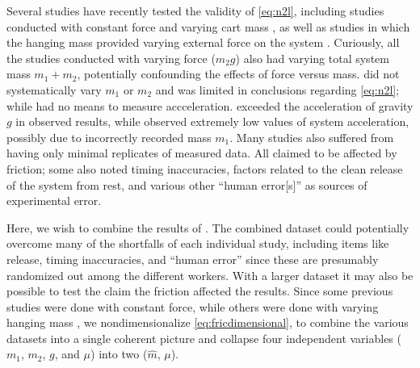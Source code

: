 \documentclass[reprint,amsmath,amssymb,aps,twoside]{revtex4-2}
\begin{document}
Several studies have recently tested the validity of \cref{eq:n2l}, including studies conducted with constant force and varying cart mass  \cite{arenas-2024-testing,avalur-2024-verifying,canada-2024-experimental,kishore-2024-relationship,yagnyeshwaran-2024-verifying}, as well as studies in which the hanging mass provided varying external force on the system \cite{govardhanen-2024-newtons,kedharnath-2024-examining,krasnopolsky-2024-testing}. Curiously, all the studies \cite{govardhanen-2024-newtons,kedharnath-2024-examining,krasnopolsky-2024-testing} conducted with varying force ($m_2g$) also had varying total system mass $m_1+m_2$, potentially confounding the effects of force versus mass. \cite{perle-2024-experimental} did not systematically vary $m_1$ or $m_2$ and was limited in conclusions regarding \cref{eq:n2l}; while \cite{barone-2024-investigating} had no means to measure accceleration. \cite{krasnopolsky-2024-testing} exceeded the acceleration of gravity $g$ in observed results, while \cite{govardhanen-2024-newtons} observed extremely low values of system acceleration, possibly due to incorrectly recorded mass $m_1$. Many studies also suffered from having only minimal replicates of measured data. All \cite{arenas-2024-testing,avalur-2024-verifying,canada-2024-experimental,kishore-2024-relationship,yagnyeshwaran-2024-verifying,govardhanen-2024-newtons,kedharnath-2024-examining,krasnopolsky-2024-testing,perle-2024-experimental} claimed to be affected by friction; some also noted timing inaccuracies, factors related to the clean release of the system from rest, and various other ``human error[s]'' as sources of experimental error. 

Here, we wish to combine the results of \cite{arenas-2024-testing,avalur-2024-verifying,canada-2024-experimental,kishore-2024-relationship,yagnyeshwaran-2024-verifying,govardhanen-2024-newtons,kedharnath-2024-examining,krasnopolsky-2024-testing,perle-2024-experimental}. The combined dataset could potentially overcome many of the shortfalls of each individual study, including items like release, timing inaccuracies, and ``human error'' since these are presumably randomized out among the different workers. With a larger dataset it may also be possible to test the claim the friction affected the results.  Since some previous studies \cite{arenas-2024-testing,avalur-2024-verifying,canada-2024-experimental,kishore-2024-relationship,yagnyeshwaran-2024-verifying} were done with constant force, while others were done with varying hanging mass \cite{govardhanen-2024-newtons,kedharnath-2024-examining,krasnopolsky-2024-testing}, we nondimensionalize \cref{eq:fricdimensional}, to combine the various datasets into a single coherent picture and collapse four independent variables ($m_1$, $m_2$, $g$, and $\mu$) into two ($\hat{m}$, $\mu$). 
\end{document}
